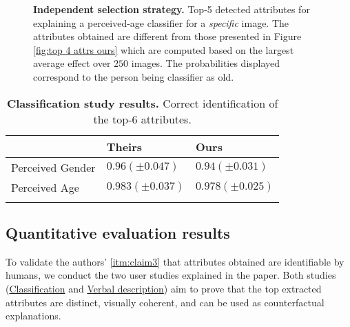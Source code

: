 \begin{figure}[h]
    \centering
 \caption{\textbf{Independent selection strategy.} Top-5 detected attributes for explaining a perceived-age classifier for a \textit{specific} image. The attributes obtained are different from those presented in Figure \ref{fig:top 4 attrs ours} which are computed based on the largest average effect over $250$ images. The probabilities displayed correspond to the person being classifier as old.}
  \label{fig:independent method}
\end{figure}
\begin{table}[h]
    \centering
    \begin{tabular}{lll}
    \toprule 
        & \textbf{Theirs} & \textbf{Ours} \\ \hline
    \midrule
        Perceived Gender & ${0.96 (\pm 0.047)}$ & ${0.94  (\pm 0.031)}$\\
        Perceived Age & ${0.983  (\pm 0.037)}$ & ${0.978  (\pm 0.025)}$\\
    \bottomrule\\
    \end{tabular}
    \caption{\textbf{Classification study results.} Correct identification of the top-6 attributes.}
    \label{tab:user study table}
\end{table}
\subsection{Quantitative evaluation results}

To validate the authors' \ref{itm:claim3} that attributes obtained are identifiable by humans, we conduct the two user studies explained in the paper. Both studies (\href{https://docs.google.com/forms/d/e/1FAIpQLSd6gU662t3YoGQI_ks49Qd1AlRU_DrshvjXzuCSQ7Rzy2Alng/viewform?fbzx=2962293837802464858}{Classification} and \href{https://docs.google.com/forms/d/e/1FAIpQLSeW8f7eaCzof2MfGsITEpsnZ2srI4r3GDTrBrYX3BDim4T38A/viewform
}{Verbal description}) aim to prove that the top extracted attributes are distinct, visually coherent, and can be used as counterfactual explanations. 

